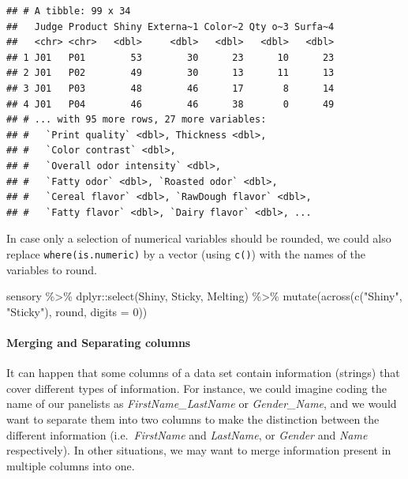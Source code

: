 \documentclass[
]{krantz}
\makeatletter
\newenvironment{Shaded}{\begin{snugshade}}{\end{snugshade}}
\newcommand{\AttributeTok}[1]{\textcolor[rgb]{0.61,0.61,0.61}{#1}}
\newcommand{\DecValTok}[1]{\textcolor[rgb]{0.06,0.06,0.06}{#1}}
\newcommand{\FunctionTok}[1]{\textcolor[rgb]{0,0,0}{#1}}
\newcommand{\NormalTok}[1]{#1}
\newcommand{\SpecialCharTok}[1]{\textcolor[rgb]{0,0,0}{#1}}
\newcommand{\StringTok}[1]{\textcolor[rgb]{0.5,0.5,0.5}{#1}}
\newenvironment{kframe}{%
\medskip{}
\setlength{\fboxsep}{.8em}
 \def\at@end@of@kframe{}%
 \ifinner\ifhmode%
  \def\at@end@of@kframe{\end{minipage}}%
  \begin{minipage}{\columnwidth}%
 \fi\fi%
 \def\FrameCommand##1{\hskip\@totalleftmargin \hskip-\fboxsep
 \colorbox{shadecolor}{##1}\hskip-\fboxsep
     \hskip-\linewidth \hskip-\@totalleftmargin \hskip\columnwidth}%
 \MakeFramed {\advance\hsize-\width
   \@totalleftmargin\z@ \linewidth\hsize
   \@setminipage}}%
 {\par\unskip\endMakeFramed%
 \at@end@of@kframe}
\renewenvironment{Shaded}{\begin{kframe}}{\end{kframe}}
\makeatother
\begin{document}
\begin{verbatim}
## # A tibble: 99 x 34
##   Judge Product Shiny Externa~1 Color~2 Qty o~3 Surfa~4
##   <chr> <chr>   <dbl>     <dbl>   <dbl>   <dbl>   <dbl>
## 1 J01   P01        53        30      23      10      23
## 2 J01   P02        49        30      13      11      13
## 3 J01   P03        48        46      17       8      14
## 4 J01   P04        46        46      38       0      49
## # ... with 95 more rows, 27 more variables:
## #   `Print quality` <dbl>, Thickness <dbl>,
## #   `Color contrast` <dbl>,
## #   `Overall odor intensity` <dbl>,
## #   `Fatty odor` <dbl>, `Roasted odor` <dbl>,
## #   `Cereal flavor` <dbl>, `RawDough flavor` <dbl>,
## #   `Fatty flavor` <dbl>, `Dairy flavor` <dbl>, ...
\end{verbatim}

In case only a selection of numerical variables should be rounded, we could also replace \texttt{where(is.numeric)} by a vector (using \texttt{c()}) with the names of the variables to round.

\begin{Shaded}
\begin{Highlighting}[]
\NormalTok{sensory }\SpecialCharTok{\%\textgreater{}\%}
\NormalTok{  dplyr}\SpecialCharTok{::}\FunctionTok{select}\NormalTok{(Shiny, Sticky, Melting) }\SpecialCharTok{\%\textgreater{}\%}
  \FunctionTok{mutate}\NormalTok{(}\FunctionTok{across}\NormalTok{(}\FunctionTok{c}\NormalTok{(}\StringTok{"Shiny"}\NormalTok{, }\StringTok{"Sticky"}\NormalTok{), round, }\AttributeTok{digits =} \DecValTok{0}\NormalTok{))}
\end{Highlighting}
\end{Shaded}

\hypertarget{merging-and-separating-columns}{%
\paragraph*{Merging and Separating columns}\label{merging-and-separating-columns}}

It can happen that some columns of a data set contain information (strings) that cover different types of information. For instance, we could imagine coding the name of our panelists as \emph{FirstName\_LastName} or \emph{Gender\_Name}, and we would want to separate them into two columns to make the distinction between the different information (i.e.~\emph{FirstName} and \emph{LastName}, or \emph{Gender} and \emph{Name} respectively). In other situations, we may want to merge information present in multiple columns into one.
\end{document}
